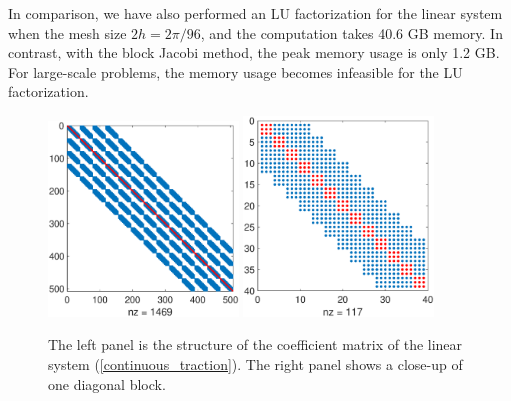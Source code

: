 In comparison, we have also performed an LU factorization for the linear system when the mesh size $2h = 2\pi/96$, and the computation takes 40.6 GB memory. In contrast, with the block Jacobi method, the peak memory usage is only 1.2 GB. For large-scale problems, the memory usage becomes infeasible for the LU factorization. 

\begin{figure}[H]
	\centering
	\includegraphics[width=0.45\textwidth,trim={0.6cm 1cm 1cm 1.2cm}, clip]{Mass_matrix.eps}
	\includegraphics[width=0.45\textwidth,trim={0.6cm 1cm 1cm 1.2cm}, clip]{Mass_diagonal_matrix.eps}
	\caption{The left panel is the structure of the coefficient matrix of the linear system (\ref{continuous_traction}).  The right panel shows a close-up of one diagonal block.}\label{Mass_matrix}
\end{figure}
